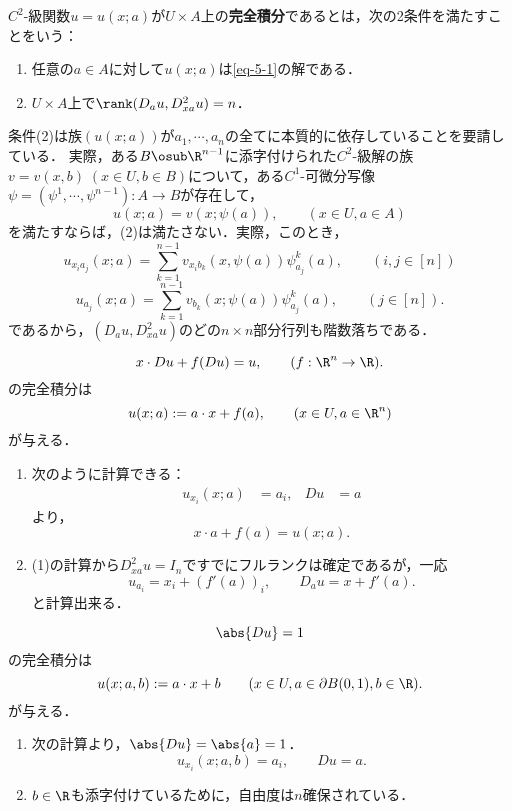 \documentclass[uplatex,dvipdfmx]{jsreport}
\begin{document}
\begin{definition}
    $C^2$-級関数$u=u(x;a)$が$U\times A$上の\textbf{完全積分}であるとは，次の2条件を満たすことをいう：
    \begin{enumerate}
        \item 任意の$a\in A$に対して$u(x;a)$は\ref{eq-5-1}の解である．
        \item $U\times A$上で$\rank(D_au,D_{xa}^2u)=n$．
    \end{enumerate}
\end{definition}
\begin{remarks}
    条件(2)は族$(u(x;a))$が$a_1,\cdots,a_n$の全てに本質的に依存していることを要請している．
    実際，ある$B\osub\R^{n-1}$に添字付けられた$C^2$-級解の族$v=v(x,b)\;(x\in U,b\in B)$について，ある$C^1$-可微分写像$\psi=(\psi^1,\cdots,\psi^{n-1}):A\to B$が存在して，
    \[u(x;a)=v(x;\psi(a)),\qquad(x\in U,a\in A)\]
    を満たすならば，(2)は満たさない．実際，このとき，
    \[u_{x_ia_j}(x;a)=\sum_{k=1}^{n-1}v_{x_ib_k}(x,\psi(a))\psi^k_{a_j}(a),\qquad(i,j\in[n])\]
    \[u_{a_j}(x;a)=\sum_{k=1}^{n-1}v_{b_k}(x;\psi(a))\psi^k_{a_j}(a),\qquad(j\in[n]).\]
    であるから，$(D_au,D_{xa}^2u)$のどの$n\times n$部分行列も階数落ちである．
\end{remarks}

\begin{example}[Clairaut方程式]
    \[x\cdot Du+f(Du)=u,\qquad(f:\R^n\to\R).\]
    の完全積分は
    \[u(x;a):=a\cdot x+f(a),\qquad(x\in U,a\in\R^n)\]
    が与える．
\end{example}
\begin{Proof}[［確認］]\mbox{}
    \begin{enumerate}
        \item 次のように計算できる：
        \begin{align*}
            u_{x_i}(x;a)&=a_i,&Du&=a
        \end{align*}
        より，
        \[x\cdot a+f(a)=u(x;a).\]
        \item (1)の計算から$D^2_{xa}u=I_n$ですでにフルランクは確定であるが，一応
        \[u_{a_i}=x_i+(f'(a))_i,\qquad D_au=x+f'(a).\]
        と計算出来る．
    \end{enumerate}
\end{Proof}

\begin{example}[eikonal方程式]
    \[\abs{Du}=1\]
    の完全積分は
    \[u(x;a,b):=a\cdot x+b\qquad(x\in U,a\in\partial B(0,1),b\in\R).\]
    が与える．
\end{example}
\begin{Proof}[［確認］]\mbox{}
    \begin{enumerate}
        \item 次の計算より，$\abs{Du}=\abs{a}=1$．
        \[u_{x_i}(x;a,b)=a_i,\qquad Du=a.\]
        \item $b\in\R$も添字付けているために，自由度は$n$確保されている．
    \end{enumerate}
\end{Proof}
\end{document}

